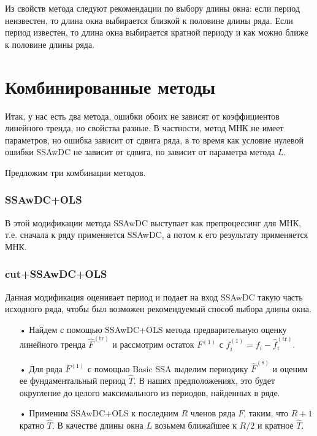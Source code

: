 \documentclass{spisok-article}
\begin{document}
Из свойств метода следуют рекомендации по выбору длины окна: если период неизвестен, то длина
окна выбирается близкой к половине длины ряда.
Если период известен, то длина окна выбирается кратной периоду и как можно ближе
к половине длины ряда.

\section{Комбинированные методы}
Итак, у нас есть два метода, ошибки обоих не зависят от коэффициентов линейного тренда,
но свойства разные. В частности, метод МНК не имеет параметров, но ошибка зависит от сдвига ряда,
в то время как условие нулевой ошибки SSAwDC не зависит от сдвига, но зависит от параметра метода $L$.

Предложим три комбинации методов.

\subsubsection{SSAwDC+OLS}
В этой модификации метода SSAwDC выступает как препроцессинг для МНК, т.е. сначала к ряду применяется
SSAwDC, а потом к его результату применяется МНК.

\subsubsection{cut+SSAwDC+OLS}
Данная модификация оценивает период и подает на вход SSAwDC такую часть исходного ряда,
чтобы был возможен рекомендуемый способ выбора длины окна.

\begin{itemize}
\item[•] Найдем с помощью SSAwDC+OLS метода предварительную оценку линейного тренда $\widehat{F}^\mathrm{(tr)}$ и рассмотрим остаток $F^{(1)}$ с  $f^{(1)}_i=f_i-\widehat{f}^\mathrm{(tr)}_i$.
\item[•] Для ряда $F^{(1)}$ с помощью Basic SSA \cite{Golyandina.etal2001} выделим периодику $\widehat{F}^\mathrm{(s)}$ и оценим ее фундаментальный период $\widehat{T}$.
В наших предположениях, это будет округление до целого максимального из периодов, найденных в ряде.
\item[•] Применим SSAwDC+OLS к последним $R$ членов ряда $F$, таким, что $R+1$ кратно $\widehat{T}$. В качестве длины окна $L$ возьмем ближайшее к $R/2$ и кратное $\widehat{T}$.
\end{itemize}
\end{document}
